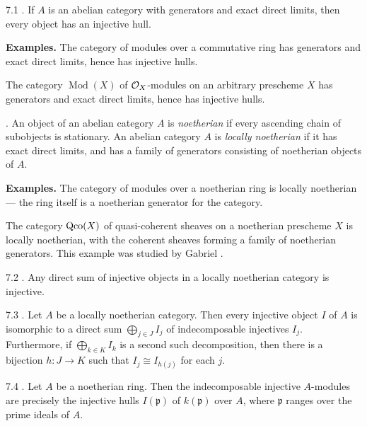 \begin{booktheorem}{7.1}\label{thm:2.7.1}
\cite[\nopp Ch.~II, Thm.~2]{5}. If $A$ is an abelian category with generators and exact direct limits, then every object has an injective hull.
\end{booktheorem}

\textbf{Examples.}
The category of modules over a commutative ring has generators and exact direct limits, hence has injective hulls.

The category $\operatorname{Mod}(X)$ of $\mathcal{O}_X$-modules on an arbitrary prescheme $X$ has generators and exact direct limits, hence has injective hulls.

\begin{definition*}
\cite[\nopp Ch.~II, \S4]{5}. An object of an abelian category $A$ is \emph{noetherian} if every ascending chain of subobjects is stationary. An abelian category $A$ is \emph{locally noetherian} if it has exact direct limits, and has a family of generators consisting of noetherian objects of $A$.
\end{definition*}

\textbf{Examples.}
The category of modules over a noetherian ring is locally noetherian --- the ring itself is a noetherian generator for the category.

The category $\operatorname{Qco}(X)$ of quasi-coherent sheaves on a noetherian prescheme $X$ is locally noetherian, with the coherent sheaves forming a family of noetherian generators. This example was studied by Gabriel \cite[\nopp Ch.~VI]{5}.

\begin{bookproposition}{7.2}\label{prop:2.7.2}
\cite[\nopp Ch.~IV, Prop.~6]{5}. Any direct sum of injective objects in a locally noetherian category is injective.
\end{bookproposition}

\begin{booktheorem}{7.3}\label{thm:2.7.3}
\cite[\nopp Ch.~IV, Thm.~2]{5}. Let $A$ be a locally noetherian category. Then every injective object $I$ of $A$ is isomorphic to a direct sum $\bigoplus_{j\in J} I_j$ of indecomposable injectives $I_j$. Furthermore, if $\bigoplus_{k\in K} I_k$ is a second such decomposition, then there is a bijection $h\colon J\to K$ such that $I_j\cong I_{h(j)}$ for each $j$.
\end{booktheorem}

\begin{bookproposition}{7.4}\label{prop:2.7.4}
\cite{13}. Let $A$ be a noetherian ring. Then the indecomposable injective $A$-modules are precisely the injective hulls $I(\mathfrak{p})$ of $k(\mathfrak{p})$ over $A$, where $\mathfrak{p}$ ranges over the prime ideals of $A$.
\end{bookproposition}

